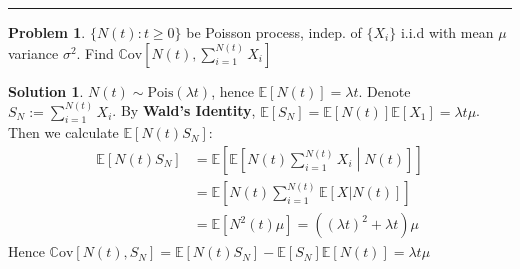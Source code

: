 \documentclass[a4paper, 10pt]{article}
\theoremstyle{definition}
\newtheorem{problem}{Problem}
\theoremstyle{hSol}
\newtheorem*{solution}{Solution}
\begin{document}
\noindent\rule{16cm}{0.4pt}
\begin{problem} $\{N(t):t\geq 0\}$ be Poisson process, indep. of $\{X_i\}$ i.i.d with mean $\mu$ variance $\sigma^2$. Find $\mathrm{\mathbb{C}ov}\left[N(t), \sum_{i=1}^{N(t)}X_i\right]$
\end{problem}
\begin{solution} $N(t)\sim \text{Pois}(\lambda t)$, hence $\mathbb{E}\left[N(t)\right]=\lambda t$. Denote $S_N := \sum_{i=1}^{N(t)}X_i$. By \textbf{Wald's Identity}, $\mathbb{E}\left[S_N\right]=\mathbb{E}\left[N(t)\right]\mathbb{E}\left[X_1\right]=\lambda t \mu$. Then we calculate $\mathbb{E}\left[N(t)S_N\right]$:
\begin{equation}
  \begin{split}
    \mathbb{E}\left[N(t)S_N\right] &= \mathbb{E}\left[\mathbb{E}\left[N(t)\sum_{i=1}^{N(t)}X_i\middle|N(t)\right]\right] \\
    &= \mathbb{E}\left[N(t)\sum_{i=1}^{N(t)}\mathbb{E}\left[X|N(t)\right]\right]\\
    &= \mathbb{E}\left[N^2(t)\mu\right] = ((\lambda t)^2 + \lambda t) \mu
  \end{split}
\end{equation}
Hence $\mathrm{\mathbb{C}ov}\left[N(t), S_N\right]=\mathbb{E}\left[N(t)S_N\right]-\mathbb{E}\left[S_N\right]\mathbb{E}\left[N(t)\right] = \lambda t \mu$
\end{solution}
\end{document}
